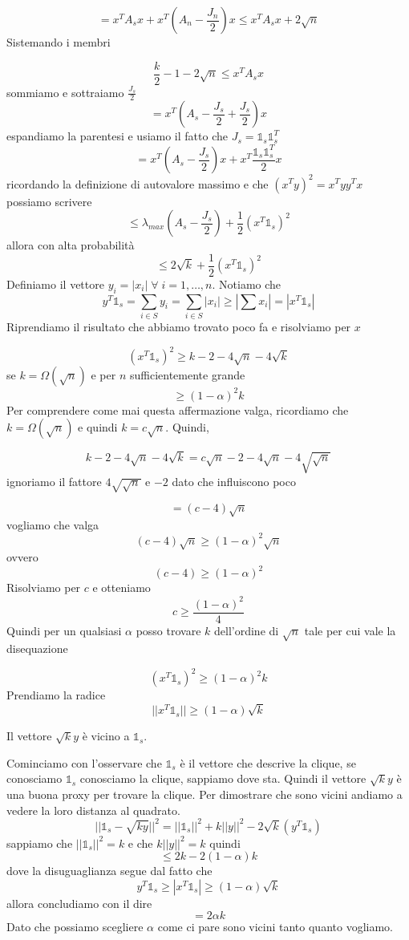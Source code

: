 \documentclass[12pt]{report}
\begin{document}
$$= x^T A_s x + x^T(A_n - \frac{J_n}{2})x \leq x^T A_s x + 2\sqrt{n}$$
Sistemando i membri

$$\frac{k}{2}-1 -  2\sqrt{n} \leq x^T A_s x$$
sommiamo e sottraiamo $\frac{J_s}{2}$
$$= x^T (A_s - \frac{J_s}{2} + \frac{J_s}{2}) x$$
espandiamo la parentesi e usiamo il fatto che $J_s = \mathds{1}_s \mathds{1}_s^T$
$$= x^T (A_s - \frac{J_s}{2}) x + x^T \frac{\mathds{1}_s \mathds{1}_s^T}{2}x$$
ricordando la definizione di autovalore massimo e che $(x^T y)^2 = x^T y y^T x$ possiamo scrivere
$$\leq \lambda_{max}(A_s - \frac{J_s}{2}) + \frac{1}{2} (x^T \mathds{1}_s)^2$$
allora con alta probabilità
$$\leq 2 \sqrt{k} + \frac{1}{2} (x^T \mathds{1}_s)^2$$
Definiamo il vettore $y_i = |x_i| \; \forall \; i = 1,\dots,n$. Notiamo che $$y^T \mathds{1}_s = \sum_{i \in S} y_i = \sum_{i \in S} |x_i|  \geq |\sum x_i| = |x^T \mathds{1}_s|$$ 
Riprendiamo il risultato che abbiamo trovato poco fa e risolviamo per $x$

$$(x^T \mathds{1}_s)^2 \geq k-2 - 4 \sqrt{n} - 4\sqrt{k}$$
se $k = \Omega(\sqrt{n})$ e per $n$ sufficientemente grande 
$$ \geq (1 - \alpha)^2 k$$
Per comprendere come mai questa affermazione valga, ricordiamo che $k = \Omega(\sqrt{n})$ e quindi $k = c \sqrt{n}$. Quindi,

$$k - 2 - 4\sqrt{n} - 4\sqrt{k} = c \sqrt{n} - 2 - 4\sqrt{n} - 4\sqrt{\sqrt{n}}$$
ignoriamo il fattore $4\sqrt{\sqrt{n}}$  e $-2$ dato che influiscono poco

$$= (c-4)\sqrt{n}$$
vogliamo che valga
$$(c-4) \sqrt{n} \geq (1-\alpha)^2 \sqrt{n}$$
ovvero
$$(c-4) \geq (1-\alpha)^2$$
Risolviamo per $c$ e otteniamo
$$c \geq \frac{(1-\alpha)^2}{4}$$
Quindi per un qualsiasi $\alpha$ posso trovare $k$ dell'ordine di $\sqrt{n}$ tale per cui vale la disequazione

$$(x^T \mathds{1}_s)^2 \geq (1-\alpha)^2 k$$
Prendiamo la radice
$$||x^T \mathds{1}_s|| \geq (1-\alpha) \sqrt{k}$$
\begin{fatto}
    Il vettore $\sqrt{k}y$ è vicino a $\mathds{1}_s$.
\end{fatto}
\begin{dimo} Cominciamo con l'osservare che $\mathds{1}_s$ è il vettore che descrive la clique, se conosciamo $\mathds{1}_s$ conosciamo la clique, sappiamo dove sta. Quindi il vettore $\sqrt{k}y$ è una buona proxy per trovare la clique. Per dimostrare che sono vicini andiamo a vedere la loro distanza al quadrato.
    $$||\mathds{1}_s - \sqrt{ky}||^2 = ||\mathds{1}_s||^2 + k ||y||^2 - 2\sqrt{k}(y^T \mathds{1}_s)$$
sappiamo che $||\mathds{1}_s||^2 = k$ e che $k ||y||^2 = k$ quindi
$$\leq 2k - 2(1-\alpha)k$$
dove la disuguaglianza segue dal fatto che
$$y^T \mathds{1}_s \geq |x^T \mathds{1}_s| \geq (1-\alpha) \sqrt{k}$$
allora concludiamo con il dire
$$= 2 \alpha k$$
Dato che possiamo scegliere $\alpha$ come ci pare sono vicini tanto quanto vogliamo.
\end{dimo}
\end{document}
